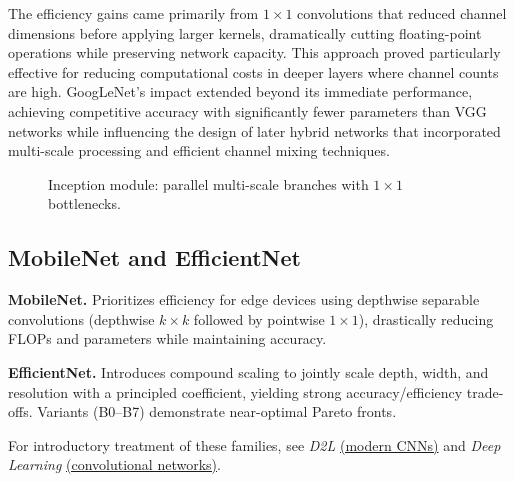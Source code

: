 The efficiency gains came primarily from $1\times1$ convolutions that reduced channel dimensions before applying larger kernels, dramatically cutting floating-point operations while preserving network capacity. This approach proved particularly effective for reducing computational costs in deeper layers where channel counts are high. GoogLeNet's impact extended beyond its immediate performance, achieving competitive accuracy with significantly fewer parameters than VGG networks while influencing the design of later hybrid networks that incorporated multi-scale processing and efficient channel mixing techniques.

\begin{figure}[h]
    \centering
    \caption{Inception module: parallel multi-scale branches with $1\times1$ bottlenecks.}
    \label{fig:inception-module}
\end{figure}

\subsection{MobileNet and EfficientNet}

\textbf{MobileNet.} Prioritizes efficiency for edge devices using depthwise separable convolutions (depthwise $k\times k$ followed by pointwise $1\times1$), drastically reducing FLOPs and parameters while maintaining accuracy.

\textbf{EfficientNet.} Introduces compound scaling to jointly scale depth, width, and resolution with a principled coefficient, yielding strong accuracy/efficiency trade-offs. Variants (B0--B7) demonstrate near-optimal Pareto fronts.

For introductory treatment of these families, see \textit{D2L} \href{https://d2l.ai/chapter_convolutional-modern/index.html}{(modern CNNs)} and \textit{Deep Learning} \href{https://www.deeplearningbook.org/contents/convnets.html}{(convolutional networks)}.

